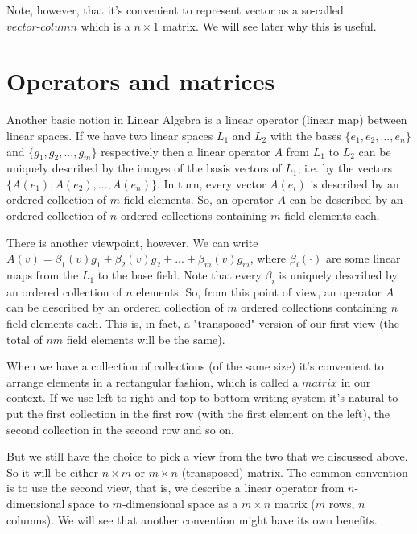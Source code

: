\documentclass{article}
\begin{document}
Note, however, that it's convenient to represent vector as a so-called $\textit{vector-column}$ which is a $n \times 1$ matrix. 
We will see later why this is useful. 

\section{Operators and matrices}

Another basic notion in Linear Algebra is a linear operator (linear map) between linear spaces. 
If we have two linear spaces $L_1$ and $L_2$ with the bases $\{e_1, e_2, ... , e_n\}$ and $\{g_1, g_2, ... , g_m\}$ respectively then
a linear operator $A$ from $L_1$ to $L_2$ can be uniquely described by the images of the basis vectors of $L_1$, 
i.e. by the vectors $\{A(e_1), A(e_2), ... ,A(e_n)\}$. 
In turn, every vector $A(e_i)$ is described by an ordered collection of $m$ field elements.
So, an operator $A$ can be described by an ordered collection of $n$ ordered collections containing $m$ field elements each. 

There is another viewpoint, however. We can write $A(v) = \beta_1(v) g_1 + \beta_2(v) g_2 + ... + \beta_m(v) g_m $, 
where $\beta_i(\cdot)$ are some linear maps from the $L_1$ to the base field. 
Note that every $\beta_i$ is uniquely described by an ordered collection of $n$ elements.
So, from this point of view, an operator $A$ can be described by an ordered collection of $m$ ordered collections containing $n$ field elements each. 
This is, in fact, a "transposed" version of our first view (the total of $nm$ field elements will be the same).

When we have a collection of collections (of the same size) it's convenient to arrange elements in a rectangular fashion, 
which is called a $\textit{matrix}$ in our context.
If we use left-to-right and top-to-bottom writing system it's natural to put the first collection in the first row 
(with the first element on the left), 
the second collection in the second row and so on. 

But we still have the choice to pick a view from the two that we discussed above. 
So it will be either $n \times m$ or $m \times n$ (transposed) matrix.
The common convention is to use the second view, 
that is, we describe a linear operator from $n$-dimensional space to $m$-dimensional space
as a $m \times n$ matrix ($m$ rows, $n$ columns). We will see that another convention might have its own benefits. 
\end{document}
